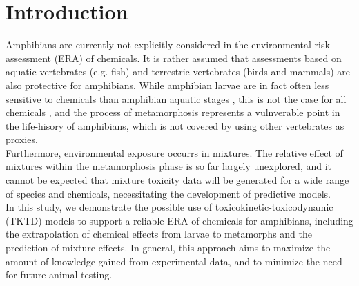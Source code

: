 \documentclass[utf8]{FrontiersinHarvard} %
\begin{document}
\section{Introduction}
%
Amphibians are currently not explicitly considered in the environmental risk assessment (ERA) of chemicals. 
It is rather assumed that assessments based on aquatic vertebrates (e.g. fish) 
and terrestric vertebrates (birds and mammals) are also protective for amphibians. 
While amphibian larvae are in fact often less sensitive to chemicals 
than amphibian aquatic stages \citep{weltjeCOMPARATIVEACUTECHRONIC2013}, 
this is not the case for all chemicals \citep{glabermanEvaluatingRoleFish2019}, 
and the process of metamorphosis represents a vulnverable point in the life-hisory of amphibians, 
which is not covered by using other vertebrates as proxies.\\
Furthermore, environmental exposure occurrs in mixtures. 
The relative effect of mixtures within the metamorphosis phase is so far largely unexplored, 
and it cannot be expected that mixture toxicity data will be generated for a wide range 
of species and chemicals, necessitating the development of predictive models.\\
%
In this study, we demonstrate the possible use of toxicokinetic-toxicodynamic (TKTD) models 
to support a reliable ERA of chemicals for amphibians, including the extrapolation 
of chemical effects from larvae to metamorphs and the prediction of mixture effects. 
In general, this approach aims to maximize the amount of knowledge gained 
from experimental data, 
and to minimize the need for future animal testing. \\
%
\end{document}
